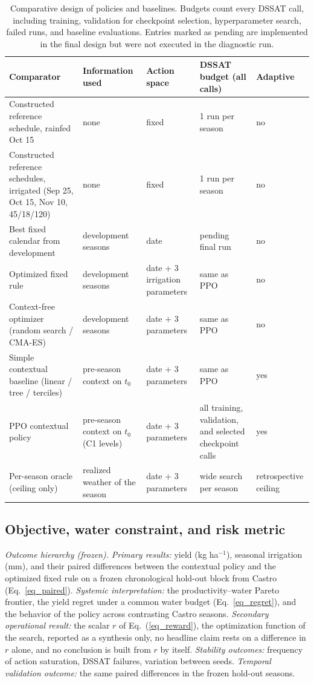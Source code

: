 \documentclass[times,final,authoryear]{elsarticle}
\begin{document}
\begin{table}[!h]
\centering
\footnotesize
\caption{Comparative design of policies and baselines. Budgets count every DSSAT call, including training, validation for checkpoint selection, hyperparameter search, failed runs, and baseline evaluations. Entries marked as pending are implemented in the final design but were not executed in the diagnostic run.}
\label{tab_design}
\begin{tabular}{p{3.5cm}p{3.0cm}p{2.5cm}p{2.3cm}p{1.6cm}}
\hline
Comparator & Information used & Action space & DSSAT budget (all calls) & Adaptive \\
\hline
Constructed reference schedule, rainfed Oct 15 & none & fixed & 1 run per season & no \\
Constructed reference schedules, irrigated (Sep 25, Oct 15, Nov 10, 45/18/120) & none & fixed & 1 run per season & no \\
Best fixed calendar from development & development seasons & date & pending final run & no \\
Optimized fixed rule & development seasons & date + 3 irrigation parameters & same as PPO & no \\
Context-free optimizer (random search / CMA-ES) & development seasons & date + 3 parameters & same as PPO & no \\
Simple contextual baseline (linear / tree / terciles) & pre-season context on $t_0$ & date + 3 parameters & same as PPO & yes \\
PPO contextual policy & pre-season context on $t_0$ (C1 levels) & date + 3 parameters & all training, validation, and selected checkpoint calls & yes \\
Per-season oracle (ceiling only) & realized weather of the season & date + 3 parameters & wide search per season & retrospective ceiling \\
\hline
\end{tabular}
\end{table}


\subsection{Objective, water constraint, and risk metric}
\label{subobjective}

\emph{Outcome hierarchy (frozen).} \emph{Primary results:} yield (kg ha$^{-1}$), seasonal irrigation (mm), and their paired differences between the contextual policy and the optimized fixed rule on a frozen chronological hold-out block from Castro (Eq.~\ref{eq_paired}). \emph{Systemic interpretation:} the productivity--water Pareto frontier, the yield regret under a common water budget (Eq.~\ref{eq_regret}), and the behavior of the policy across contrasting Castro seasons. \emph{Secondary operational result:} the scalar $r$ of Eq.~(\ref{eq_reward}), the optimization function of the search, reported as a synthesis only, no headline claim rests on a difference in $r$ alone, and no conclusion is built from $r$ by itself. \emph{Stability outcomes:} frequency of action saturation, DSSAT failures, variation between seeds. \emph{Temporal validation outcome:} the same paired differences in the frozen hold-out seasons.
\end{document}
